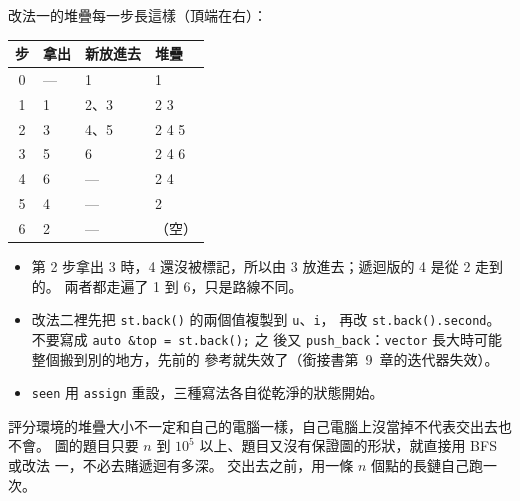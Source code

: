 
改法一的堆疊每一步長這樣（頂端在右）：

\begin{center}
\begin{tabular}{clll}
\toprule
步 & 拿出 & 新放進去 & 堆疊 \\
\midrule
0 & --- & 1 & 1 \\
1 & 1 & 2、3 & 2 3 \\
2 & 3 & 4、5 & 2 4 5 \\
3 & 5 & 6 & 2 4 6 \\
4 & 6 & --- & 2 4 \\
5 & 4 & --- & 2 \\
6 & 2 & --- & （空）\\
\bottomrule
\end{tabular}
\end{center}

\begin{itemize}
\item 第 2 步拿出 3 時，4 還沒被標記，所以由 3 放進去；遞迴版的 4 是從 2 走到
的。 兩者都走遍了 1 到 6，只是路線不同。
\item 改法二裡先把 \texttt{st.back()} 的兩個值複製到 \texttt{u}、\texttt{i}，
再改 \texttt{st.back().second}。 不要寫成 \texttt{auto \&top = st.back();} 之
後又 \texttt{push\_back}：\texttt{vector} 長大時可能整個搬到別的地方，先前的
參考就失效了（銜接書第~9~章的迭代器失效）。
\item \texttt{seen} 用 \texttt{assign} 重設，三種寫法各自從乾淨的狀態開始。
\end{itemize}

\begin{apcsnote}
評分環境的堆疊大小不一定和自己的電腦一樣，自己電腦上沒當掉不代表交出去也不會。
圖的題目只要 $n$ 到 $10^5$ 以上、題目又沒有保證圖的形狀，就直接用 BFS 或改法
一，不必去賭遞迴有多深。 交出去之前，用一條 $n$ 個點的長鏈自己跑一次。
\end{apcsnote}

